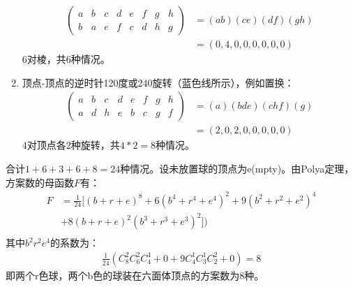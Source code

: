\begin{solution}
\begin{enumerate}
\begin{align*}
         \left(
            \begin{matrix}
               a & b & c & d & e & f & g & h\\
               b & a & e & f & c & d & h & g
            \end{matrix}
            \right) &= (ab)(ce)(df)(gh) \\
            &= (0,4,0,0,0,0,0,0)
      \end{align*}
      6对棱，共$6$种情况。
      \item 顶点-顶点的逆时针120度或240旋转（蓝色线所示），例如置换：
      \begin{align*}
         \left(
            \begin{matrix}
               a & b & c & d & e & f & g & h\\
               a & d & h & e & b & c & g & f
            \end{matrix}
            \right) &= (a)(bde)(chf)(g) \\
            &= (2,0,2,0,0,0,0,0)
      \end{align*}
      4对顶点各2种旋转，共$4*2=8$种情况。
   \end{enumerate}
   合计$1+6+3+6+8=24$种情况。设未放置球的顶点为e(mpty)。由Polya定理，方案数的母函数$F$有：
   \begin{align*}
      F&=\frac{1}{24}[(b+r+e)^8+6(b^4+r^4+e^4)^2+9(b^2+r^2+e^2)^4\\
      &+8(b+r+e)^2(b^3+r^3+e^3)^2])\\
   \end{align*}
   其中$b^2r^2e^4$的系数为：
   \begin{align*}
      \frac{1}{24}\left(C_8^2C_6^2C_4^4+0+9C_4^1C_3^1C_2^2+0\right) = 8
   \end{align*}
   即两个r色球，两个b色的球装在六面体顶点的方案数为8种。
\end{solution}